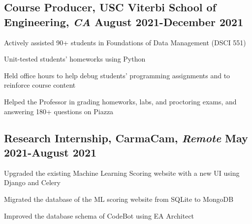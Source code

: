 \documentclass[11pt]{article}
\begin{document}
\subsection*{Course Producer{\normalfont, USC Viterbi School of Engineering,
            \textit{CA} \hfill
            August 2021-December 2021}}
\begin{compactitem}
    \item Actively assisted 90+ students in Foundations of Data Management
    (DSCI 551)
    \item Unit-tested students' homeworks using Python
    \item Held office hours to help debug students' programming assignments
    and to reinforce
    course content
    \item Helped the Professor in grading homeworks, labs, and proctoring exams, and
    answering 180+ questions on Piazza
\end{compactitem}

\subsection*{Research Internship{\normalfont, CarmaCam, \textit{Remote} \hfill May 2021-August 2021}}
\begin{compactitem}
    \item Upgraded the existing Machine Learning Scoring website with a new UI using Django and Celery
	\item Migrated the database of the ML scoring website from SQLite to MongoDB
	\item Improved the database schema of CodeBot using EA Architect
\end{compactitem}

\end{document}
